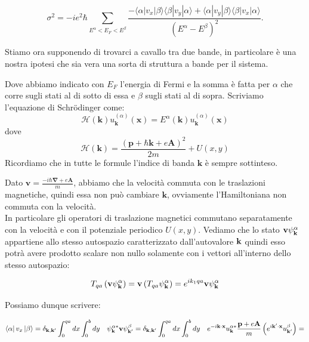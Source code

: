\documentclass[12pt,a4paper]{article}
\begin{document}
\begin{equation}
\sigma^2 = -ie^2 \hbar \sum_{E^{\alpha} < E_{F} < E^{\beta}} \frac{- \langle \alpha |v_x|\beta \rangle \langle \beta |v_y|\alpha \rangle + \langle \alpha |v_y|\beta \rangle \langle \beta |v_x|\alpha \rangle}{(E^\alpha - E^\beta)^2} .
\end{equation}

Stiamo ora supponendo di trovarci a cavallo tra due bande, in particolare è una nostra ipotesi che sia vera una sorta di struttura a bande per il sistema.

Dove abbiamo indicato con $E_{F}$ l'energia di Fermi e la somma è fatta per $\alpha$ che corre sugli stati al di sotto di essa e $\beta$ sugli stati al di sopra. Scriviamo l'equazione di Schrödinger come: $$ \mathcal{H} (\mathbf{k}) u^{(\alpha)}_{\mathbf{k}} (\mathbf{x}) = E^{\alpha} (\mathbf{k}) u^{(\alpha)}_{\mathbf{k}} (\mathbf{x})$$ dove 
\begin{equation}
\mathcal{H} (\mathbf{k}) = \frac{(\mathbf{p} + \hbar \mathbf{k} + e \mathbf{A})^2}{2m} + U(x, y) 
\end{equation}
Ricordiamo che in tutte le formule l'indice di banda $\mathbf{k}$ è sempre sottinteso.

Dato $\mathbf{v} = \frac{-i \hbar \mathbf{\nabla} + e \mathbf{A}}{m}$, abbiamo che la velocità commuta con le traslazioni magnetiche, quindi essa non può cambiare $\mathbf{k}$, ovviamente l'Hamiltoniana non commuta con la velocità.\\
In particolare gli operatori di traslazione magnetici commutano separatamente con la velocità e con il potenziale periodico $U(x, y)$. Vediamo che lo stato $\bold{v}  \psi_{\mathbf{k}}^{\alpha}$ appartiene allo stesso autospazio caratterizzato dall'autovalore $\bold{k}$ quindi esso potrà avere prodotto scalare non nullo solamente con i vettori all'interno dello stesso autospazio:

\[
T_{qa} \left( \bold{v}  \psi_{\mathbf{k}}^{\alpha} \right) = \bold{v} \left( T_{qa}  \psi_{\mathbf{k}}^{\alpha} \right) = e^{i k_1 q a} \bold{v}  \psi_{\mathbf{k}}^{\alpha}
\]

Possiamo dunque scrivere:

\[
\bra{\alpha} v_{x} \ket{\beta} = \delta_{\mathbf{k}, \mathbf{k'}} \int_{0}^{qa} dx \int_{0}^{b} dy  \quad \psi_{\mathbf{k}}^{\alpha *} \mathbf{v} \psi_{\mathbf{k'}}^{\beta} = \delta_{\mathbf{k}, \mathbf{k'}} \int_{0}^{qa} dx \int_{0}^{b} dy  \quad e^{-i \bold{k} \cdot \bold{x}} u_{\mathbf{k}}^{\alpha *} \frac{\bold{p} + e \bold{A}}{m} \left( e^{i \bold{k'} \cdot \bold{x}} u_{\mathbf{k'}}^{\beta} \right)= 
\]
\end{document}
